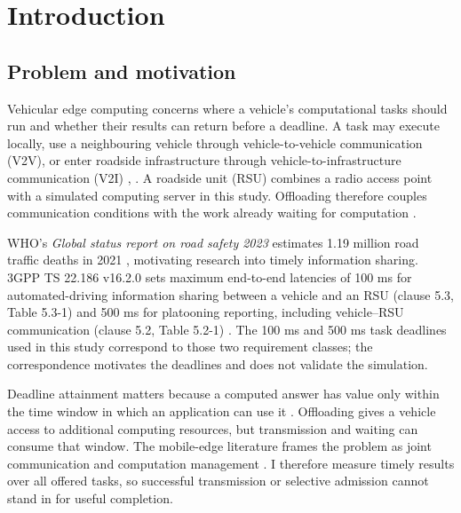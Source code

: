 \documentclass[12pt,a4paper]{article}
\begin{document}
\section{Introduction}\label{sec:1}

\FloatBarrier
\subsection{Problem and motivation}\label{sec:1.1}

Vehicular edge computing concerns where a vehicle's computational tasks should run and whether their results can return before a deadline. A task may execute locally, use a neighbouring vehicle through vehicle-to-vehicle communication (V2V), or enter roadside infrastructure through vehicle-to-infrastructure communication (V2I) \cite{ref1}, \cite{ref2}. A roadside unit (RSU) combines a radio access point with a simulated computing server in this study. Offloading therefore couples communication conditions with the work already waiting for computation \cite{ref3}.

WHO's \emph{Global status report on road safety 2023} estimates 1.19 million road traffic deaths in 2021 \cite{ref43}, motivating research into timely information sharing. 3GPP TS 22.186 v16.2.0 sets maximum end-to-end latencies of 100 ms for automated-driving information sharing between a vehicle and an RSU (clause 5.3, Table 5.3-1) and 500 ms for platooning reporting, including vehicle--RSU communication (clause 5.2, Table 5.2-1) \cite{ref42}. The 100 ms and 500 ms task deadlines used in this study correspond to those two requirement classes; the correspondence motivates the deadlines and does not validate the simulation.

Deadline attainment matters because a computed answer has value only within the time window in which an application can use it \cite{ref4}. Offloading gives a vehicle access to additional computing resources, but transmission and waiting can consume that window. The mobile-edge literature frames the problem as joint communication and computation management \cite{ref3}. I therefore measure timely results over all offered tasks, so successful transmission or selective admission cannot stand in for useful completion.
\end{document}
